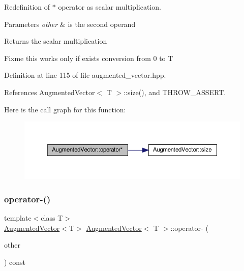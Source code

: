 Redefinition of $\ast$ operator as scalar multiplication. 


\begin{DoxyParams}{Parameters}
{\em other} & is the second operand \\
\hline
\end{DoxyParams}
\begin{DoxyReturn}{Returns}
the scalar multiplication 
\end{DoxyReturn}
Fixme this works only if exists conversion from 0 to T 

Definition at line 115 of file augmented\+\_\+vector.\+hpp.



References Augmented\+Vector$<$ T $>$\+::size(), and T\+H\+R\+O\+W\+\_\+\+A\+S\+S\+E\+RT.

Here is the call graph for this function\+:
\nopagebreak
\begin{figure}[H]
\begin{center}
\leavevmode
\includegraphics[width=350pt]{d1/d7a/classAugmentedVector_a6be307e136294e678924bf96991ec91c_cgraph}
\end{center}
\end{figure}
\mbox{\label{classAugmentedVector_a70155aea13012d13bbef754d4b379a6d}} 
\subsubsection{\texorpdfstring{operator-\/()}{operator-()}}
{\footnotesize\ttfamily template$<$class T$>$ \\
\hyperlink{classAugmentedVector}{Augmented\+Vector}$<$T$>$ \hyperlink{classAugmentedVector}{Augmented\+Vector}$<$ T $>$\+::operator-\/ (\begin{DoxyParamCaption}\item[{const \hyperlink{classAugmentedVector}{Augmented\+Vector}$<$ T $>$ \&}]{other }\end{DoxyParamCaption}) const\hspace{0.3cm}{\ttfamily [inline]}}



